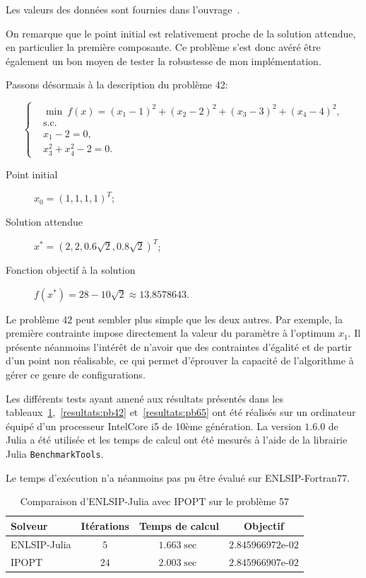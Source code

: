 Les valeurs des données sont fournies dans l'ouvrage~\cite{hockschi}.

On remarque que le point initial est relativement proche de la solution attendue, en particulier la première composante. Ce problème s'est donc avéré être également un bon moyen de tester la robustesse de mon implémentation.

Passons désormais à la description du problème 42:

\begin{equation}
    \label{pb42}
\left\{  
\begin{aligned} 
&\min\ f(x)=(x_1-1)^2+(x_2-2)^2+(x_3-3)^2+(x_4-4)^2, \\ 
&\text{s.c.}\\
&x_1-2 = 0,\\
&x_3^2+x_4^2-2= 0.
\end{aligned} \right.
\end{equation}

\begin{description}
    \item[Point initial] $x_0 = (1,1,1,1)^T$;
    \item[Solution attendue] $x^* = (2,2,0.6\sqrt 2, 0.8\sqrt 2)^T$;
    \item[Fonction objectif à la solution] $f(x^*) =28-10\sqrt 2\approx 13.8578643$.
\end{description}

Le problème 42 peut sembler plus simple que les deux autres. Par exemple, la première contrainte impose directement la valeur du paramètre à l'optimum $x_1$.
Il présente néanmoins l'intérêt de n'avoir que des contraintes d'égalité et de partir d'un point non réalisable, ce qui permet d'éprouver la capacité de l'algorithme
à gérer ce genre de configurations.

Les différents tests ayant amené aux résultats présentés dans les tableaux~\ref{resultats:pb57},~\ref{resultats:pb42} et~\ref{resultats:pb65} ont été réalisés sur un ordinateur équipé d'un 
processeur IntelCore i5 de 10ème génération. La version $1.6.0$ de Julia a été utilisée et les temps de calcul ont été mesurés à l'aide de la librairie Julia \texttt{BenchmarkTools}. 

Le temps d'exécution n'a néanmoins pas pu être évalué sur ENLSIP-Fortran77.

\begin{table}
    \centering
    \begin{tabular}{|l|c|c|c|}
        \hline
        Solveur & Itérations & Temps de calcul &  Objectif \\ \hline
        ENLSIP-Julia & $5$ & $1.663\sec$ & $2.845966972\text{e-}02$ \\\hline
        IPOPT & $24$ & $2.003\sec$ & $2.845966907\text{e-}02$\\ \hline
    \end{tabular}  
    \caption{Comparaison d'ENLSIP-Julia avec IPOPT sur le problème 57}
    \label{resultats:pb57}
\end{table}

